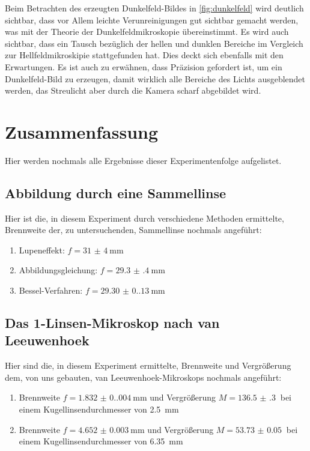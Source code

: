 \documentclass[12pt,english,ngerman]{scrartcl}
\begin{document}
Beim Betrachten des erzeugten Dunkelfeld-Bildes in \autoref{fig:dunkelfeld}
wird deutlich sichtbar, dass vor Allem leichte Verunreinigungen gut sichtbar
gemacht werden, was mit der Theorie der Dunkelfeldmikroskopie übereinstimmt. Es
wird auch sichtbar, dass ein Tausch bezüglich der hellen und dunklen Bereiche
im Vergleich zur Hellfeldmikroskipie stattgefunden hat. Dies deckt sich
ebenfalls mit den Erwartungen. Es ist auch zu erwähnen, dass Präzision
gefordert ist, um ein Dunkelfeld-Bild zu erzeugen, damit wirklich alle Bereiche
des Lichts ausgeblendet werden, das Streulicht aber durch die Kamera scharf
abgebildet wird.

\section{Zusammenfassung}\label{sec:zusammenfassung}

Hier werden nochmals alle Ergebnisse dieser Experimentenfolge aufgelistet.

\subsection{Abbildung durch eine Sammellinse}

Hier ist die, in diesem Experiment durch verschiedene Methoden ermittelte,
Brennweite der, zu untersuchenden, Sammellinse nochmals angeführt:

\begin{enumerate}
	\item Lupeneffekt: $f = \SI{31(4)}{\mm} $
	\item Abbildungsgleichung: $f = \SI{29.3(4)}{\mm} $
	\item Bessel-Verfahren: $f = \SI{29.30(0.13)}{\mm} $
\end{enumerate}

\subsection{Das 1-Linsen-Mikroskop nach van Leeuwenhoek}

Hier sind die, in diesem Experiment ermittelte, Brennweite und Vergrößerung
dem, von uns gebauten, van Leeuwenhoek-Mikroskops nochmals angeführt:

\begin{enumerate}
	\item Brennweite $f=\SI{1.832(0.004)}{\mm}$ und Vergrößerung $M=\SI{136.5(3)}{}$ bei
	      einem Kugellinsendurchmesser von \SI{2.5}{\mm}
	\item Brennweite $f=\SI{4.652(3)}{\mm}$ und Vergrößerung $M=\SI{53.73(5)}{}$ bei
	      einem Kugellinsendurchmesser von \SI{6.35}{\mm}
\end{enumerate}
\end{document}
